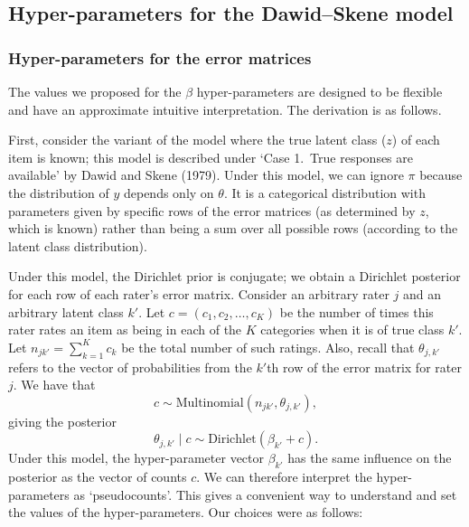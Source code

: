 \hypertarget{sec:hyperparameters}{%
\subsection{Hyper-parameters for the Dawid--Skene model}\label{sec:hyperparameters}}

\hypertarget{hyper-parameters-for-the-error-matrices}{%
\subsubsection{Hyper-parameters for the error matrices}\label{hyper-parameters-for-the-error-matrices}}

The values we proposed for the \(\beta\) hyper-parameters are designed to
be flexible and have an approximate intuitive interpretation. The
derivation is as follows.

First, consider the variant of the model where the true latent class
(\(z\)) of each item is known; this model is described under `Case 1.~True
responses are available' by Dawid and Skene (1979). Under this model, we can ignore
\(\pi\) because the distribution of \(y\) depends only on \(\theta\). It is a
categorical distribution with parameters given by specific rows of the
error matrices (as determined by \(z\), which is known) rather than being
a sum over all possible rows (according to the latent class
distribution).

Under this model, the Dirichlet prior is conjugate; we obtain a
Dirichlet posterior for each row of each rater's error matrix. Consider
an arbitrary rater \(j\) and an arbitrary latent class \(k'\). Let
\(c = (c_1, c_2, \dots, c_K)\) be the number of times this rater rates an
item as being in each of the \(K\) categories when it is of true class
\(k'\). Let \(n_{jk'} = \sum_{k = 1}^K c_k\) be the total number of such
ratings. Also, recall that \(\theta_{j, k'}\) refers to the vector of
probabilities from the \(k'\)th row of the error matrix for rater \(j\). We
have that
\[
c \sim \textrm{Multinomial}\left(n_{jk'}, \theta_{j, k'}\right),
\]
giving the posterior
\[
\theta_{j, k'} \mid c
\sim \textrm{Dirichlet}(\beta_{k'} + c).
\]
Under this model, the hyper-parameter vector \(\beta_{k'}\) has the same
influence on the posterior as the vector of counts \(c\). We can therefore
interpret the hyper-parameters as `pseudocounts'. This gives a
convenient way to understand and set the values of the hyper-parameters.
Our choices were as follows:

